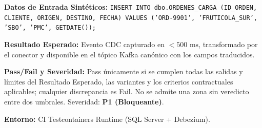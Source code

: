 \par\noindent\textbf{Datos de Entrada Sintéticos:} \texttt{I\allowbreak{}N\allowbreak{}S\allowbreak{}E\allowbreak{}R\allowbreak{}T\allowbreak{} I\allowbreak{}N\allowbreak{}T\allowbreak{}O\allowbreak{} d\allowbreak{}b\allowbreak{}o\allowbreak{}.\allowbreak{}O\allowbreak{}R\allowbreak{}D\allowbreak{}E\allowbreak{}N\allowbreak{}E\allowbreak{}S\allowbreak{}\_\allowbreak{}C\allowbreak{}A\allowbreak{}R\allowbreak{}G\allowbreak{}A\allowbreak{} (\allowbreak{}I\allowbreak{}D\allowbreak{}\_\allowbreak{}O\allowbreak{}R\allowbreak{}D\allowbreak{}E\allowbreak{}N\allowbreak{},\allowbreak{} C\allowbreak{}L\allowbreak{}I\allowbreak{}E\allowbreak{}N\allowbreak{}T\allowbreak{}E\allowbreak{},\allowbreak{} O\allowbreak{}R\allowbreak{}I\allowbreak{}G\allowbreak{}E\allowbreak{}N\allowbreak{},\allowbreak{} D\allowbreak{}E\allowbreak{}S\allowbreak{}T\allowbreak{}I\allowbreak{}N\allowbreak{}O\allowbreak{},\allowbreak{} F\allowbreak{}E\allowbreak{}C\allowbreak{}H\allowbreak{}A\allowbreak{})\allowbreak{} V\allowbreak{}A\allowbreak{}L\allowbreak{}U\allowbreak{}E\allowbreak{}S\allowbreak{} (\allowbreak{}'\allowbreak{}O\allowbreak{}R\allowbreak{}D\allowbreak{}-\allowbreak{}9\allowbreak{}9\allowbreak{}0\allowbreak{}1\allowbreak{}'\allowbreak{},\allowbreak{} '\allowbreak{}F\allowbreak{}R\allowbreak{}U\allowbreak{}T\allowbreak{}I\allowbreak{}C\allowbreak{}O\allowbreak{}L\allowbreak{}A\allowbreak{}\_\allowbreak{}S\allowbreak{}U\allowbreak{}R\allowbreak{}'\allowbreak{},\allowbreak{} '\allowbreak{}S\allowbreak{}B\allowbreak{}O\allowbreak{}'\allowbreak{},\allowbreak{} '\allowbreak{}P\allowbreak{}M\allowbreak{}C\allowbreak{}'\allowbreak{},\allowbreak{} G\allowbreak{}E\allowbreak{}T\allowbreak{}D\allowbreak{}A\allowbreak{}T\allowbreak{}E\allowbreak{}(\allowbreak{})\allowbreak{})\allowbreak{};\allowbreak{}}\par
\par\noindent\textbf{Resultado Esperado:} Evento CDC capturado en \(< 500\text{ ms}\), transformado por el conector y disponible en el tópico Kafka canónico con los campos traducidos.\par
\par\noindent\textbf{Pass/Fail y Severidad:} Pass únicamente si se cumplen todas las salidas y límites del Resultado Esperado, las variantes y los criterios contractuales aplicables; cualquier discrepancia es Fail. No se admite una zona sin veredicto entre dos umbrales. Severidad: \textbf{P1 (Bloqueante)}.\par
\par\noindent\textbf{Entorno:} CI Testcontainers Runtime (SQL Server + Debezium).\par







